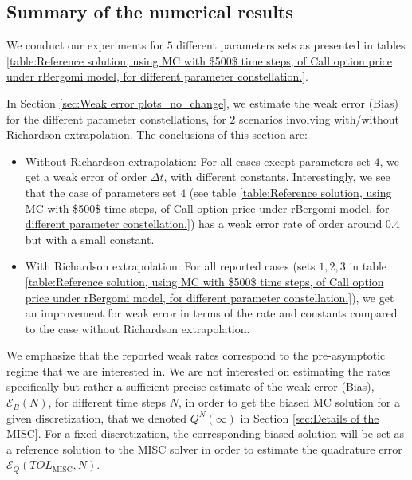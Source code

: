

\subsection{Summary of the numerical results}

We conduct our experiments for $5$ different parameters  sets as presented in tables \ref{table:Reference solution, using MC with $500$ time steps, of Call option price under rBergomi model, for different parameter constellation.}. 

In Section \ref{sec:Weak error plots_no_change}, we estimate the weak error  (Bias) for the different parameter constellations, for $2$ scenarios involving with/without  Richardson extrapolation. The conclusions of this section are: 
\begin{itemize}
	\item Without Richardson extrapolation: For all cases except parameters set $4$, we get a weak error of order $\Delta t$, with different  constants. Interestingly, we see that the case of parameters set $4$ (see table \ref{table:Reference solution, using MC with $500$ time steps, of Call option price under rBergomi model, for different parameter constellation.}) has a weak error rate of order around $0.4$ but with a small constant. 
	
		\item With Richardson extrapolation: For all reported cases (sets  $1,2,3$ in table \ref{table:Reference solution, using MC with $500$ time steps, of Call option price under rBergomi model, for different parameter constellation.}), we get an improvement for weak error in terms of the rate and constants compared to the case without Richardson extrapolation.
\end{itemize}

\begin{remark}
We emphasize that the reported weak rates correspond to the pre-asymptotic regime that we are interested in. We are not interested on estimating the rates specifically but rather a sufficient precise estimate of the weak error (Bias), $\mathcal{E}_B(N)$, for different time steps $N$, in order to get the biased MC  solution for a given discretization, that we denoted $Q^N(\infty)$ in Section \ref{sec:Details of the MISC}.  For a fixed discretization, the corresponding biased solution will be set as a reference solution to the MISC solver in order to estimate the quadrature error $\mathcal{E}_Q(TOL_{\text{MISC}},N)$.	
\end{remark}

